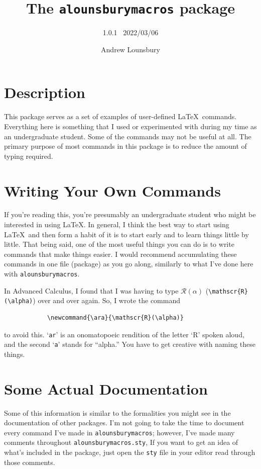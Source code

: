 \documentclass[12pt]{article}
\begin{document}
    \title{The \texttt{alounsburymacros} package}
    \author{1.0.1 \ 2022/03/06}
    \date{Andrew Lounsbury}
    \maketitle

    \section{Description}
    This package serves as a set of examples of user-defined \LaTeX\ commands. Everything here is something that I used or experimented with during my time as an undergraduate student. Some of the commands may not be useful at all. The primary purpose of most commands in this package is to reduce the amount of typing required. 

    \section{Writing Your Own Commands}
    If you're reading this, you're presumably an undergraduate student who might be interested in using \LaTeX. In general, I think the best way to start using \LaTeX\ and then form a habit of it is to start early and to learn things little by little. \p
    That being said, one of the most useful things you can do is to write commands that make things easier. I would recommend accumulating these commands in one file (package) as you go along, similarly to what I've done here with \texttt{alounsburymacros}. 
    \begin{example*}
        In Advanced Calculus, I found that I was having to type $\mathscr{R}(\alpha)$ (\texttt{\textbackslash mathscr\{R\}(\textbackslash alpha)}) over and over again. So, I wrote the command 
        \begin{verbatim}
            \newcommand{\ara}{\mathscr{R}(\alpha)}
        \end{verbatim}
        to avoid this. `\texttt{ar}' is an onomatopoeic rendition of the letter `R' spoken aloud, and the second `\texttt{a}' stands for ``alpha.'' You have to get creative with naming these things. 
    \end{example*}
    
    \section{Some Actual Documentation}
    Some of this information is similar to the formalities you might see in the documentation of other packages. \p
    I'm not going to take the time to document every command I've made in \texttt{alounsburymacros}; however, I've made many comments throughout \texttt{alounsburymacros.sty}, If you want to get an idea of what's included in the package, just open the \texttt{sty} file in your editor read through those comments. 
\end{document}
